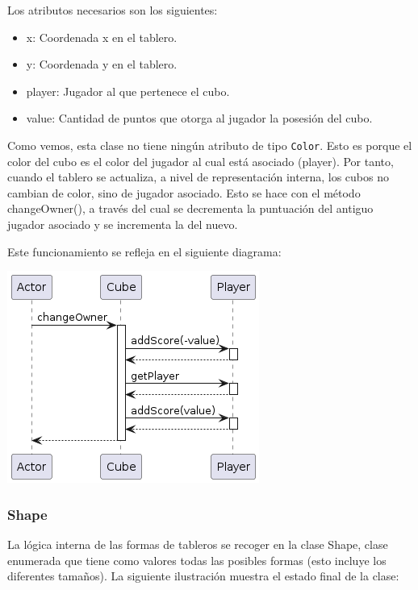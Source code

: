 \documentclass[12pt,a4paper,openright]{book}
\theoremstyle{break}
\begin{document}
Los atributos necesarios son los siguientes:
\begin{itemize}
\item x: Coordenada x en el tablero.
\item y: Coordenada y en el tablero.
\item player: Jugador al que pertenece el cubo.
\item value: Cantidad de puntos que otorga al jugador la posesión del cubo.
\end{itemize}

Como vemos, esta clase no tiene ningún atributo de tipo \texttt{Color}. Esto es porque el color del cubo es el color del jugador al cual está asociado (player). Por tanto, cuando el tablero se actualiza, a nivel de representación interna, los cubos no cambian de color, sino de jugador asociado. Esto se hace con el método changeOwner(), a través del cual se decrementa la puntuación del antiguo jugador asociado y se incrementa la del nuevo.

Este funcionamiento se refleja en el siguiente diagrama:

\begin{center}
\includegraphics[scale=0.75]{Cube.changeOwner()-sprint7.png} 
\end{center}

\newpage

\subsubsection{Shape}

La lógica interna de las formas de tableros se recoger en la clase Shape, clase enumerada que tiene como valores todas las posibles formas (esto incluye los diferentes tamaños). La siguiente ilustración muestra el estado final de la clase:
\end{document}
